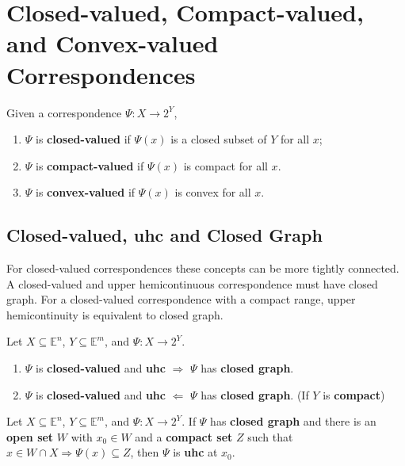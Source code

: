 \documentclass[11pt]{elegantbook}
\begin{document}
\section{Closed-valued, Compact-valued, and Convex-valued Correspondences}
\begin{definition}
    \normalfont
    Given a correspondence $\Psi : X \rightarrow 2^Y$,
    \begin{enumerate}
        \item $\Psi$ is \textbf{closed-valued} if $\Psi(x)$ is a closed subset of $Y$ for all $x$;
        \item $\Psi$ is \textbf{compact-valued} if $\Psi(x)$ is compact for all $x$.
        \item $\Psi$ is \textbf{convex-valued} if $\Psi(x)$ is convex for all $x$.
    \end{enumerate}
\end{definition}

\subsection{Closed-valued, uhc and Closed Graph}
For closed-valued correspondences these concepts can be more tightly connected. A closed-valued and upper hemicontinuous correspondence must have closed graph. For a closed-valued correspondence with a compact range, upper hemicontinuity is equivalent to closed graph.

\begin{theorem}
    Let $X\subseteq \mathbb{E}^n$, $Y\subseteq \mathbb{E}^m$, and $\Psi: X \rightarrow 2^Y$.
    \begin{enumerate}
        \item $\Psi$ is \textbf{closed-valued} and \textbf{uhc} $\Rightarrow$ $\Psi$ has \textbf{closed graph}.
        \item $\Psi$ is \textbf{closed-valued} and \textbf{uhc} $\Leftarrow$ $\Psi$ has \textbf{closed graph}. (If $Y$ is \textbf{compact})
    \end{enumerate}
\end{theorem}

\begin{theorem}
    Let $X\subseteq \mathbb{E}^n$, $Y\subseteq \mathbb{E}^m$, and $\Psi: X \rightarrow 2^Y$. If $\Psi$ has \textbf{closed graph} and there is an \textbf{open set} $W$ with $x_0 \in W$ and a \textbf{compact set} $Z$ such that $x \in W \cap X \Rightarrow \Psi(x) \subseteq Z$, then $\Psi$ is \textbf{uhc} at $x_0$.
\end{theorem}
\end{document}

